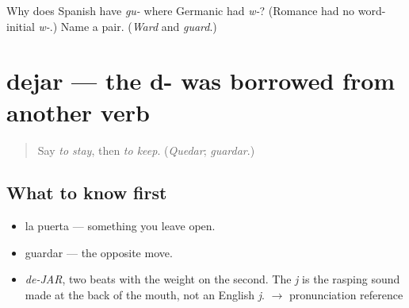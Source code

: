 \begin{tcolorbox}[breakable,colback=teal!4,colframe=teal!35!black,title={Before you move on}]
Why does Spanish have \emph{gu-} where Germanic had \emph{w-}? (Romance had no word-initial \emph{w-}.) Name a pair. (\emph{Ward} and \emph{guard}.)
\end{tcolorbox}
\section[dejar]{dejar — the d- was borrowed from another verb}

\label{lesson:ES-C383-dejar}



\begin{quote}
Say \emph{to stay}, then \emph{to keep}. (\emph{Quedar}; \emph{guardar}.)
\end{quote}

\subsection*{What to know first}
\begin{itemize}
\raggedright
  \item la puerta — something you leave open.
  \item guardar — the opposite move.
\end{itemize}

\begin{sounds}
\begin{itemize}
\raggedright
  \item \emph{de-JAR}, two beats with the weight on the second. The \emph{j} is the rasping sound made at the back of the mouth, not an English \emph{j}. $\to$ pronunciation reference
\end{itemize}
\end{sounds}

